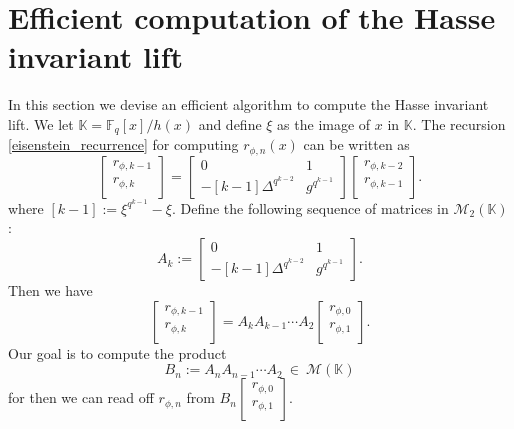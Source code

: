 \documentclass{article}
\theoremstyle{plain}
\theoremstyle{definition}
\def\F{\ensuremath{\mathbb{F}}}
\def\K{\ensuremath{\mathbb{K}}}
\begin{document}
\section{Efficient computation of the Hasse invariant lift}
\label{sec:hasse}

In this section we devise an efficient algorithm to compute the Hasse invariant lift. We let $\K = \F_q[x]/h(x)$ and define $\xi$ as the image of $x$ in $\K$. The recursion \ref{eisenstein_recurrence} for computing $r_{\phi,n}(x)$ can be written as
\[
\begin{bmatrix}
r_{\phi,k - 1} \\
r_{\phi,k} \\
\end{bmatrix} = 
\begin{bmatrix}
0 & 1 \\
-[k - 1]\Delta^{q^{k - 2}} & g^{q^{k - 1}}
\end{bmatrix}
\begin{bmatrix}
r_{\phi,k - 2} \\
r_{\phi,k - 1} \\
\end{bmatrix}.
\]
where $[k - 1]:=\xi^{q^{k - 1}}-\xi$. Define the following sequence of matrices in 
$\mathscr{M}_2(\K)$:
\[
A_k :=\begin{bmatrix}
0 & 1 \\
-[k - 1]\Delta^{q^{k - 2}} & g^{q^{k - 1}}
\end{bmatrix}.
\]
Then we have
\[
\begin{bmatrix}
r_{\phi,k - 1} \\
r_{\phi,k} \\
\end{bmatrix} = 
A_kA_{k - 1} \cdots A_2
\begin{bmatrix}
r_{\phi,0} \\
r_{\phi,1} \\
\end{bmatrix}.
\]
Our goal is to compute the product 
\[B_n := A_nA_{n - 1} \cdots A_2 ~ \in ~ \mathscr{M}(\K)\]
for then we can read off $r_{\phi,n}$ from $B_n\begin{bmatrix}
r_{\phi,0} \\
r_{\phi,1} \\
\end{bmatrix}.$ 
\end{document}

